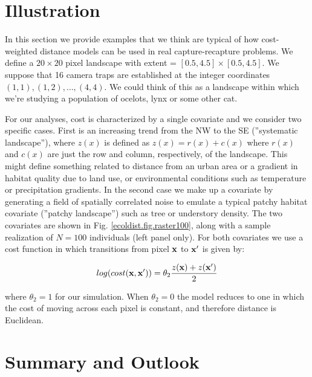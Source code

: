 \section{Illustration}

In this section we provide examples that we think are typical of how
cost-weighted distance models can be used in real capture-recapture
problems.  We define a $20 \times 20$ pixel landscape with 
extent = $[0.5, 4.5] \times [0.5, 4.5]$.  
We suppose that 16 camera traps are established at the integer coordinates
$(1,1), (1,2), \ldots, (4,4)$. We could think of this as a landscape
within which we're studying a population of ocelots, lynx or some
other cat.

For our analyses, cost is characterized by a single covariate 
and we consider two specific cases. First is an increasing trend from
the NW to the SE (''systematic landscape''), where $z(x)$ is defined as
$z(x) = r(x) + c(x)$ where $r(x)$ and $c(x)$ are just the row and
column, respectively, of the landscape.  This might define something
related to distance from an urban area or a gradient in habitat
quality due to land use, or environmental conditions such as
temperature or precipitation gradients.  In the second case we make up
a covariate by generating a field of spatially correlated noise to
emulate a typical patchy habitat covariate (''patchy landscape'') such as
tree or understory density. The two covariates are shown in
Fig. \ref{ecoldist.fig.raster100}, along with a sample realization of
$N=100$ individuals (left panel only).  For both covariates we use a
cost function in which transitions from pixel ${\bf x}$ to ${\bf x}'$
is given by:

\[
 log(cost({\bf x},{\bf x}'))=  \theta_2 \frac{z({\bf x}) + z({\bf x}')}{2}
\]

{\flushleft where} $\theta_2 = 1$ for our simulation.
When $\theta_2=0$ the
model reduces to one in which the cost of moving across each pixel is
constant, and therefore distance is Euclidean.








\section{Summary and Outlook}


